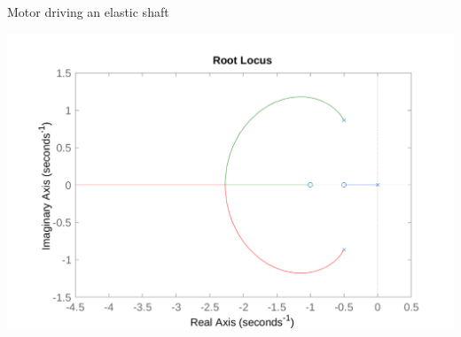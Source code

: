 \documentclass[presentation,aspectratio=169, usenames, dvipsnames]{beamer}
\begin{document}
\begin{frame}[label={sec:org20b9a17}]{Motor driving an elastic shaft}
\begin{center}
  \includegraphics[width=.7\linewidth]{../../figures/shaft-rlocus}
\end{center}
\end{frame}
\end{document}
